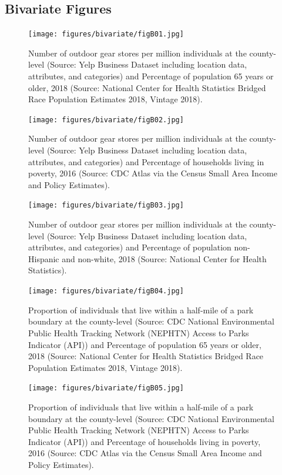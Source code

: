 \documentclass{article}
\begin{document}
\newpage
\subsection{\textbf{Bivariate Figures}}
\begin{figure}[!h] 
    \centering
    \caption{Number of outdoor gear stores per million individuals at the county-level (Source: Yelp Business Dataset including location data, attributes, and categories) and Percentage of population 65 years or older, 2018 (Source: National Center for Health Statistics Bridged Race Population Estimates 2018, Vintage 2018). }
    \texttt{[image: figures/bivariate/figB01.jpg]}
    \
\end{figure}
\FloatBarrier

\begin{figure}[!h] 
    \centering
    \caption{Number of outdoor gear stores per million individuals at the county-level (Source: Yelp Business Dataset including location data, attributes, and categories) and Percentage of households living in poverty, 2016 (Source: CDC Atlas via the Census Small Area Income and Policy Estimates).}
    \texttt{[image: figures/bivariate/figB02.jpg]}
    \
\end{figure}
\FloatBarrier

\begin{figure}[!h] 
    \centering
    \caption{Number of outdoor gear stores per million individuals at the county-level (Source: Yelp Business Dataset including location data, attributes, and categories) and Percentage of population non-Hispanic and non-white, 2018 (Source: National Center for Health Statistics).}
    \texttt{[image: figures/bivariate/figB03.jpg]}
    \
\end{figure}
\FloatBarrier

\begin{figure}[!h] 
    \centering
    \caption{Proportion of individuals that live within a half-mile of a park boundary at the county-level (Source: CDC National Environmental Public Health Tracking Network (NEPHTN) Access to Parks Indicator (API)) and Percentage of population 65 years or older, 2018 (Source: National Center for Health Statistics Bridged Race Population Estimates 2018, Vintage 2018). }
    \texttt{[image: figures/bivariate/figB04.jpg]}
    \
\end{figure}
\FloatBarrier

\begin{figure}[!h] 
    \centering
    \caption{Proportion of individuals that live within a half-mile of a park boundary at the county-level (Source: CDC National Environmental Public Health Tracking Network (NEPHTN) Access to Parks Indicator (API)) and Percentage of households living in poverty, 2016 (Source: CDC Atlas via the Census Small Area Income and Policy Estimates).}
    \texttt{[image: figures/bivariate/figB05.jpg]}
    \
\end{figure}
\FloatBarrier
\end{document}
